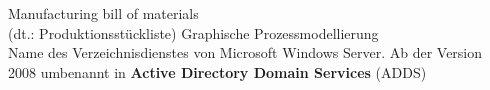 
\begin{acronym}
	 Manufacturing bill of materials\\
	(dt.: Produktionsstückliste)
	 Graphische Prozessmodellierung
	\\
	Name des Verzeichnisdienstes von Microsoft Windows Server. Ab der Version 2008 umbenannt in \textbf{Active Directory Domain Services} (ADDS)
\end{acronym}